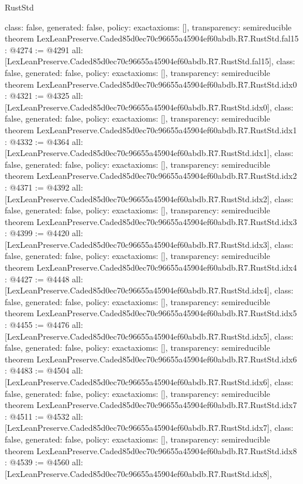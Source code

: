 \begin{lexlean}{RustStd}
\begin{coremodule}
{  class: false,
  generated: false,
  policy: exact{axioms: []},
  transparency: semireducible
}
theorem LexLeanPreserve.Caded85d0ec70c96655a45904ef60abdb.R7.RustStd.fal15 : @4274 := @4291 {
  all: [LexLeanPreserve.Caded85d0ec70c96655a45904ef60abdb.R7.RustStd.fal15],
  class: false,
  generated: false,
  policy: exact{axioms: []},
  transparency: semireducible
}
theorem LexLeanPreserve.Caded85d0ec70c96655a45904ef60abdb.R7.RustStd.idx0 : @4321 := @4325 {
  all: [LexLeanPreserve.Caded85d0ec70c96655a45904ef60abdb.R7.RustStd.idx0],
  class: false,
  generated: false,
  policy: exact{axioms: []},
  transparency: semireducible
}
theorem LexLeanPreserve.Caded85d0ec70c96655a45904ef60abdb.R7.RustStd.idx1 : @4332 := @4364 {
  all: [LexLeanPreserve.Caded85d0ec70c96655a45904ef60abdb.R7.RustStd.idx1],
  class: false,
  generated: false,
  policy: exact{axioms: []},
  transparency: semireducible
}
theorem LexLeanPreserve.Caded85d0ec70c96655a45904ef60abdb.R7.RustStd.idx2 : @4371 := @4392 {
  all: [LexLeanPreserve.Caded85d0ec70c96655a45904ef60abdb.R7.RustStd.idx2],
  class: false,
  generated: false,
  policy: exact{axioms: []},
  transparency: semireducible
}
theorem LexLeanPreserve.Caded85d0ec70c96655a45904ef60abdb.R7.RustStd.idx3 : @4399 := @4420 {
  all: [LexLeanPreserve.Caded85d0ec70c96655a45904ef60abdb.R7.RustStd.idx3],
  class: false,
  generated: false,
  policy: exact{axioms: []},
  transparency: semireducible
}
theorem LexLeanPreserve.Caded85d0ec70c96655a45904ef60abdb.R7.RustStd.idx4 : @4427 := @4448 {
  all: [LexLeanPreserve.Caded85d0ec70c96655a45904ef60abdb.R7.RustStd.idx4],
  class: false,
  generated: false,
  policy: exact{axioms: []},
  transparency: semireducible
}
theorem LexLeanPreserve.Caded85d0ec70c96655a45904ef60abdb.R7.RustStd.idx5 : @4455 := @4476 {
  all: [LexLeanPreserve.Caded85d0ec70c96655a45904ef60abdb.R7.RustStd.idx5],
  class: false,
  generated: false,
  policy: exact{axioms: []},
  transparency: semireducible
}
theorem LexLeanPreserve.Caded85d0ec70c96655a45904ef60abdb.R7.RustStd.idx6 : @4483 := @4504 {
  all: [LexLeanPreserve.Caded85d0ec70c96655a45904ef60abdb.R7.RustStd.idx6],
  class: false,
  generated: false,
  policy: exact{axioms: []},
  transparency: semireducible
}
theorem LexLeanPreserve.Caded85d0ec70c96655a45904ef60abdb.R7.RustStd.idx7 : @4511 := @4532 {
  all: [LexLeanPreserve.Caded85d0ec70c96655a45904ef60abdb.R7.RustStd.idx7],
  class: false,
  generated: false,
  policy: exact{axioms: []},
  transparency: semireducible
}
theorem LexLeanPreserve.Caded85d0ec70c96655a45904ef60abdb.R7.RustStd.idx8 : @4539 := @4560 {
  all: [LexLeanPreserve.Caded85d0ec70c96655a45904ef60abdb.R7.RustStd.idx8],
}
\end{coremodule}
\end{lexlean}
